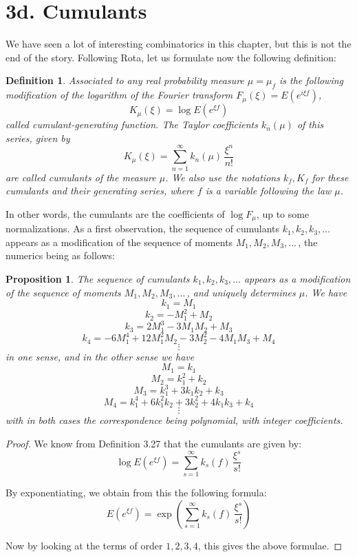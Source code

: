 \documentclass[12pt]{amsbook}
\newtheorem{definition}[theorem]{Definition}
\newtheorem{proposition}[theorem]{Proposition}
\begin{document}
\section*{3d. Cumulants}

We have seen a lot of interesting combinatorics in this chapter, but this is not the end of the story. Following Rota, let us formulate now the following definition:


\begin{definition}
Associated to any real probability measure $\mu=\mu_f$ is the following modification of the logarithm of the Fourier transform $F_\mu(\xi)=E(e^{i\xi f})$,
$$K_\mu(\xi)=\log E(e^{\xi f})$$
called cumulant-generating function. The Taylor coefficients $k_n(\mu)$ of this series, given by
$$K_\mu(\xi)=\sum_{n=1}^\infty k_n(\mu)\,\frac{\xi^n}{n!}$$
are called cumulants of the measure $\mu$. We also use the notations $k_f,K_f$ for these cumulants and their generating series, where $f$ is a variable following the law $\mu$.
\end{definition}

In other words, the cumulants are the coefficients of $\log F_\mu$, up to some normalizations. As a first observation, the sequence of cumulants $k_1,k_2,k_3,\ldots$ appears as a modification of the sequence of moments $M_1,M_2,M_3,\ldots\,$, the numerics being as follows:


\begin{proposition}
The sequence of cumulants $k_1,k_2,k_3,\ldots$ appears as a modification of the sequence of moments $M_1,M_2,M_3,\ldots\,$, and uniquely determines $\mu$. We have
$$k_1=M_1$$
$$k_2=-M_1^2+M_2$$
$$k_3=2M_1^3-3M_1M_2+M_3$$
$$k_4=-6M_1^4+12M_1^2M_2-3M_2^2-4M_1M_3+M_4$$
$$\vdots$$
in one sense, and in the other sense we have
$$M_1=k_1$$
$$M_2=k_1^2+k_2$$
$$M_3=k_1^3+3k_1k_2+k_3$$
$$M_4=k_1^4+6k_1^2k_2+3k_2^2+4k_1k_3+k_4$$
$$\vdots$$
with in both cases the correspondence being polynomial, with integer coefficients.
\end{proposition}

\begin{proof}
We know from Definition 3.27 that the cumulants are given by:
$$\log E(e^{\xi f})=\sum_{s=1}^\infty k_s(f)\,\frac{\xi^s}{s!}$$

By exponentiating, we obtain from this the following formula:
$$E(e^{\xi f})=\exp\left(\sum_{s=1}^\infty k_s(f)\,\frac{\xi^s}{s!}\right)$$

Now by looking at the terms of order $1,2,3,4$, this gives the above formulae.
\end{proof}
\end{document}

